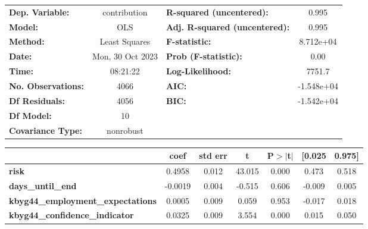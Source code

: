 \begin{center}
\begin{tabular}{lclc}
\toprule
\textbf{Dep. Variable:}                   &   contribution   & \textbf{  R-squared (uncentered):}      &     0.995   \\
\textbf{Model:}                           &       OLS        & \textbf{  Adj. R-squared (uncentered):} &     0.995   \\
\textbf{Method:}                          &  Least Squares   & \textbf{  F-statistic:       }          & 8.712e+04   \\
\textbf{Date:}                            & Mon, 30 Oct 2023 & \textbf{  Prob (F-statistic):}          &     0.00    \\
\textbf{Time:}                            &     08:21:22     & \textbf{  Log-Likelihood:    }          &    7751.7   \\
\textbf{No. Observations:}                &        4066      & \textbf{  AIC:               }          & -1.548e+04  \\
\textbf{Df Residuals:}                    &        4056      & \textbf{  BIC:               }          & -1.542e+04  \\
\textbf{Df Model:}                        &          10      & \textbf{                     }          &             \\
\textbf{Covariance Type:}                 &    nonrobust     & \textbf{                     }          &             \\
\bottomrule
\end{tabular}
\begin{tabular}{lcccccc}
                                          & \textbf{coef} & \textbf{std err} & \textbf{t} & \textbf{P$> |$t$|$} & \textbf{[0.025} & \textbf{0.975]}  \\
\midrule
\textbf{risk}                             &       0.4958  &        0.012     &    43.015  &         0.000        &        0.473    &        0.518     \\
\textbf{days\_until\_end}                 &      -0.0019  &        0.004     &    -0.515  &         0.606        &       -0.009    &        0.005     \\
\textbf{kbyg44\_employment\_expectations} &       0.0005  &        0.009     &     0.059  &         0.953        &       -0.017    &        0.018     \\
\textbf{kbyg44\_confidence\_indicator}    &       0.0325  &        0.009     &     3.554  &         0.000        &        0.015    &        0.050     \\

\end{tabular}
\end{center}
